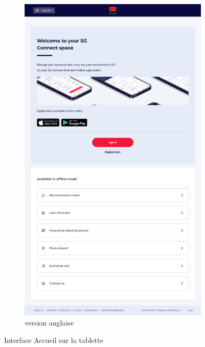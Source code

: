 \begin{figure}[!h]
\begin{subfigure}[b]{0.49\textwidth}
        \includegraphics[width=\textwidth]{images/screens/home/tablette.png}
        \caption{version anglaise}
    \end{subfigure}
       \caption{Interface Accueil sur la tablette}
\end{figure}

\newpage

